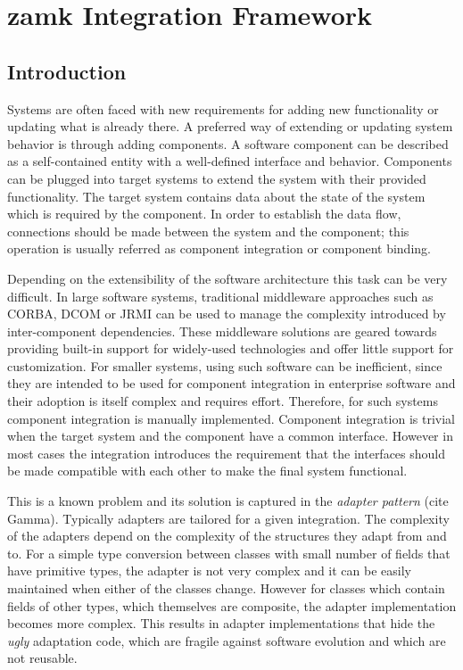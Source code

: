 \chapter{zamk Integration Framework}


\section{Introduction}
Systems are often faced with new requirements for adding new functionality or updating what is already there. 
A preferred way of extending or updating system behavior is through adding components. 
A software component can be described as a self-contained entity with a well-defined interface and behavior. 
Components can be plugged into target systems to extend the system with their provided functionality.
The target system contains data about the state of the system which is required by the component. 
In order to establish the data flow, connections should be made between the system and the component; this operation is usually referred as component integration or component binding. 

Depending on the extensibility of the software architecture this task can be very difficult. 
In large software systems, traditional middleware approaches such as CORBA, DCOM or JRMI can be used to manage the complexity introduced by inter-component dependencies. 
These middleware solutions are geared towards providing built-in support for widely-used technologies and offer little support for customization. 
For smaller systems, using such software can be inefficient, since they are intended to be used for component integration in enterprise software and their adoption is itself complex and requires effort. Therefore, for such systems component integration is manually implemented. Component integration is trivial when the target system and the component have a common interface. However in most cases the integration introduces the requirement that the interfaces should be made compatible with each other to make the final system functional.

This is a known problem and its solution is captured in the \emph{adapter pattern} (cite Gamma). 
Typically adapters are tailored for a given integration. 
The complexity of the adapters depend on the complexity of the structures they adapt from and to. 
For a simple type conversion between classes with small number of fields that have primitive types, the adapter is not very complex and it can be easily maintained when either of the classes change. 
However for classes which contain fields of other types, which themselves are composite, the adapter implementation becomes more complex.
This results in adapter implementations that hide the \emph{ugly} adaptation code, which are fragile against software evolution and which are not reusable. 

